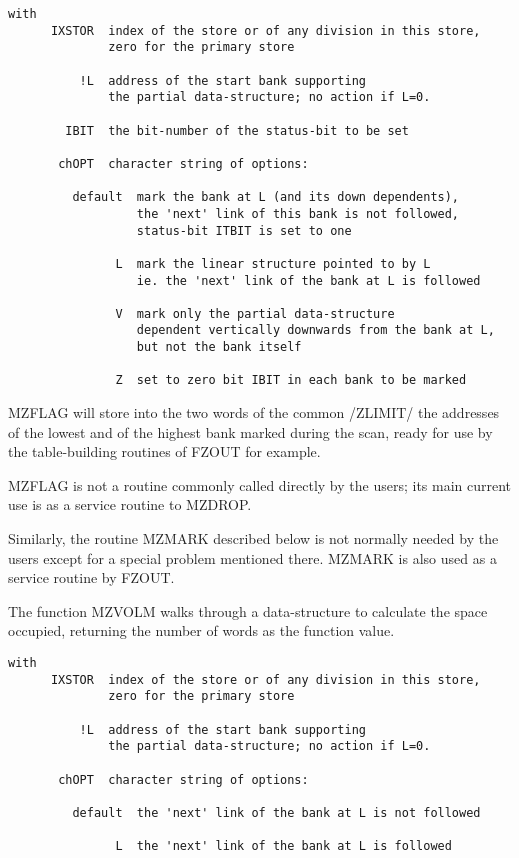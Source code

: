 \begin{verbatim}
with
      IXSTOR  index of the store or of any division in this store,
              zero for the primary store

          !L  address of the start bank supporting
              the partial data-structure; no action if L=0.

        IBIT  the bit-number of the status-bit to be set

       chOPT  character string of options:

         default  mark the bank at L (and its down dependents),
                  the 'next' link of this bank is not followed,
                  status-bit ITBIT is set to one

               L  mark the linear structure pointed to by L
                  ie. the 'next' link of the bank at L is followed

               V  mark only the partial data-structure
                  dependent vertically downwards from the bank at L,
                  but not the bank itself

               Z  set to zero bit IBIT in each bank to be marked
\end{verbatim} 

MZFLAG will store into the two words of the common /ZLIMIT/
the addresses of the lowest and of the highest bank marked
during the scan, ready for use by the table-building routines
of FZOUT for example.

MZFLAG is not a routine commonly called directly by the users;
its main current use is as a service routine to MZDROP.

Similarly, the routine MZMARK described below
is not normally needed by the users except for a special problem
mentioned there.
MZMARK is also used as a service routine by FZOUT.

The function MZVOLM walks through a data-structure to calculate
the space occupied, returning the number of words as the function value.

\begin{verbatim}
with
      IXSTOR  index of the store or of any division in this store,
              zero for the primary store

          !L  address of the start bank supporting
              the partial data-structure; no action if L=0.

       chOPT  character string of options:

         default  the 'next' link of the bank at L is not followed

               L  the 'next' link of the bank at L is followed


\end{verbatim} 


